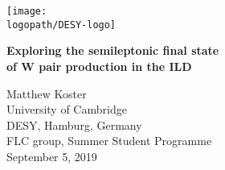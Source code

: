 \begin{titlepage}

  \begin{center}
    \texttt{[image: \\logopath/DESY-logo]}
  \end{center}

  \vspace{0em}

  \begin{minipage}[t]{\textwidth}

    \begin{minipage}{\linewidth}

      \vspace{0em}

      \begin{center}\bfseries\huge
        Exploring the semileptonic final state \\ of W pair production in the ILD
      \end{center}

      \vspace{1.0 em}

      \begin{center}\large
        Matthew Koster\\
        University of Cambridge\\
        DESY, Hamburg, Germany\\
        FLC group, Summer Student Programme\\[0.5cm]
        September 5, 2019
      \end{center}

    \end{minipage}
  \end{minipage}

  \vspace{1cm}

  \begin{abstract}
    
  \end{abstract}

\end{titlepage}
